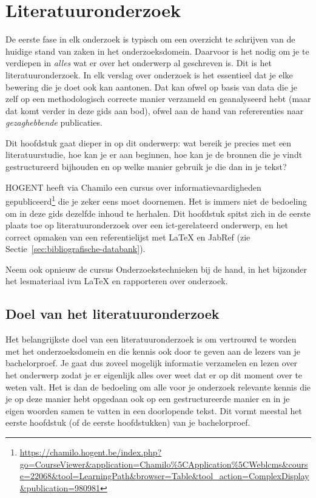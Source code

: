\chapter{Literatuuronderzoek}
\label{ch:literatuuronderzoek}

De eerste fase in elk onderzoek is typisch om een overzicht te schrijven van de huidige stand van zaken in het onderzoeksdomein. Daarvoor is het nodig om je te verdiepen in \emph{alles} wat er over het onderwerp al geschreven is. Dit is het literatuuronderzoek. In elk verslag over onderzoek is het essentieel dat je elke bewering die je doet ook kan aantonen. Dat kan ofwel op basis van data die je zelf op een methodologisch correcte manier verzameld en geanalyseerd hebt (maar dat komt verder in deze gids aan bod), ofwel aan de hand van refererenties naar \emph{gezaghebbende} publicaties.

Dit hoofdstuk gaat dieper in op dit onderwerp: wat bereik je precies met een literatuurstudie, hoe kan je er aan beginnen, hoe kan je de bronnen die je vindt gestructureerd bijhouden en op welke manier gebruik je die dan in je tekst?

HOGENT heeft via Chamilo een cursus over informatievaardigheden gepubliceerd\footnote{\url{https://chamilo.hogent.be/index.php?go=CourseViewer\&application=Chamilo\%5CApplication\%5CWeblcms\&course=22068\&tool=LearningPath\&browser=Table\&tool_action=ComplexDisplay\&publication=980981}} die je zeker eens moet doornemen. Het is immers niet de bedoeling om in deze gids dezelfde inhoud te herhalen. Dit hoofdstuk spitst zich in de eerste plaats toe op literatuuronderzoek over een ict-gerelateerd onderwerp, en het correct opmaken van een referentielijst met {\LaTeX} en JabRef (zie Sectie~\ref{sec:bibliografische-databank}).

Neem ook opnieuw de cursus Onderzoekstechnieken bij de hand, in het bijzonder het lesmateriaal ivm {\LaTeX} en rapporteren over onderzoek.

\section{Doel van het literatuuronderzoek}
\label{sec:doel-literatuuronderzoek}

Het belangrijkste doel van een literatuuronderzoek is om vertrouwd te worden met het onderzoeksdomein en die kennis ook door te geven aan de lezers van je bachelorproef. Je gaat dus zoveel mogelijk informatie verzamelen en lezen over het onderwerp zodat je er eigenlijk alles over weet dat er op dit moment over te weten valt. Het is dan de bedoeling om alle voor je onderzoek relevante kennis die je op deze manier hebt opgedaan ook op een gestructureerde manier en in je eigen woorden samen te vatten in een doorlopende tekst. Dit vormt meestal het eerste hoofdstuk (of de eerste hoofdstukken) van je bachelorproef.

